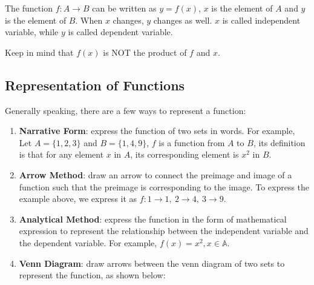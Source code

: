 \documentclass{report}
\begin{document}
\begin{multicols}{2}
  The function $f: A \to B$ can be written as $y = f(x)$, $x$ is the element of
  $A$ and $y$ is the element of $B$. When $x$ changes, $y$ changes as well. $x$
  is called independent variable, while $y$ is called dependent variable.

  Keep in mind that $f(x)$ is NOT the product of $f$ and $x$.

  \subsection*{Representation of Functions}

  Generally speaking, there are a few ways to represent a function:
  \begin{enumerate}
    \item \textbf{Narrative Form}: express the function of two sets in words. For example, Let $A = \big\{1, 2, 3\big\}$ and $B = \big\{1, 4, 9\big\}$, $f$ is a function from $A$ to $B$, its definition is that for any element $x$ in $A$, its corresponding element is $x^2$ in $B$.
    \item \textbf{Arrow Method}: draw an arrow to connect the preimage and image of a function such that the preimage is corresponding to the image. To express the example above, we express it as $f: 1 \to 1,\ 2 \to 4,\ 3 \to 9$.
    \item \textbf{Analytical Method}: express the function in the form of mathematical expression to represent the relationship between the independent variable and the dependent variable. For example, $f(x) = x^2, x \in \mathbb{A}$.
    \item \textbf{Venn Diagram}: draw arrows between the venn diagram of two sets to represent the function, as shown below:
          \begin{center}
\end{center}
\end{enumerate}
\end{multicols}
\end{document}
